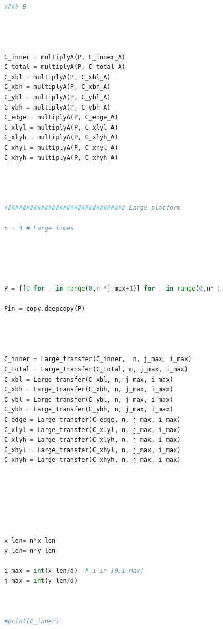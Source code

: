 \documentclass[12pt]{article}
\begin{document}
\begin{scriptsize}
\begin{lstlisting}[language=python,caption={Python code-Potential Flow}]
        
            #### B
        
        
            
        
            C_inner = multiplyA(P, C_inner_A)
            C_total = multiplyA(P, C_total_A)
            C_xbl = multiplyA(P, C_xbl_A)
            C_xbh = multiplyA(P, C_xbh_A)
            C_ybl = multiplyA(P, C_ybl_A)
            C_ybh = multiplyA(P, C_ybh_A)
            C_edge = multiplyA(P, C_edge_A)
            C_xlyl = multiplyA(P, C_xlyl_A)
            C_xlyh = multiplyA(P, C_xlyh_A)
            C_xhyl = multiplyA(P, C_xhyl_A)
            C_xhyh = multiplyA(P, C_xhyh_A)
            
        
        
        
            ################################# Large platform
        
            n = 3 # Large times
        
        
        
        
        
            P = [[0 for _ in range(0,n *j_max+1)] for _ in range(0,n* i_max+1)]
        
            Pin = copy.deepcopy(P)
        
        
        
        
            C_inner = Large_transfer(C_inner,  n, j_max, i_max)
            C_total = Large_transfer(C_total, n, j_max, i_max)
            C_xbl = Large_transfer(C_xbl, n, j_max, i_max)
            C_xbh = Large_transfer(C_xbh, n, j_max, i_max)
            C_ybl = Large_transfer(C_ybl, n, j_max, i_max)
            C_ybh = Large_transfer(C_ybh, n, j_max, i_max)
            C_edge = Large_transfer(C_edge, n, j_max, i_max)
            C_xlyl = Large_transfer(C_xlyl, n, j_max, i_max)
            C_xlyh = Large_transfer(C_xlyh, n, j_max, i_max)
            C_xhyl = Large_transfer(C_xhyl, n, j_max, i_max)
            C_xhyh = Large_transfer(C_xhyh, n, j_max, i_max)
        
        
        
        
        
        
        
            x_len= n*x_len
            y_len= n*y_len
        
            i_max = int(x_len/d)  # i in [0,i_max]
            j_max = int(y_len/d)
        
        
        
            #print(C_inner)
        
        
        

\end{lstlisting}
\end{scriptsize}
\end{document}
